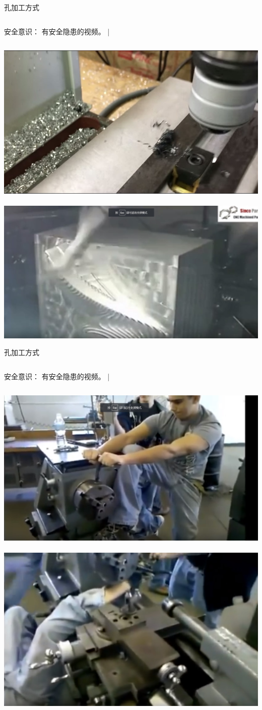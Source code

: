 \documentclass[utf8,zihao=-4,handout,smaller,aspectratio=1610]{ctexbeamer}
\begin{document}
\begin{frame}{孔加工方式}
	\begin{columns}
		\begin{block}{安全意识：}
			有安全隐患的视频。
			|\end{block}
	\end{columns}
	
	\vspace{25pt}
	
	\includegraphics[width=.5\linewidth,trim=0 0 0  0,clip,angle=0]{image/duandao.jpg}~
	\includegraphics[width=0.5\linewidth,trim=0 0 0 0,clip,angle=0]{image/anquandadao.jpg}
	
\end{frame}

\begin{frame}{孔加工方式}
	\begin{columns}
		\column{.05\textwidth}
		\column{.6\textwidth}
		\begin{block}{安全意识：}
			有安全隐患的视频。
			|\end{block}
		\column{.0\textwidth}
	\end{columns}
	
	\vspace{25pt}
	
	\includegraphics[width=.5\linewidth,trim=0 0 0  0,clip,angle=0]{image/anquan1.jpg}~
	\includegraphics[width=0.5\linewidth,trim=0 0 0 0,clip,angle=0]{image/anquan2.jpg}
	
\end{frame}
\end{document}
